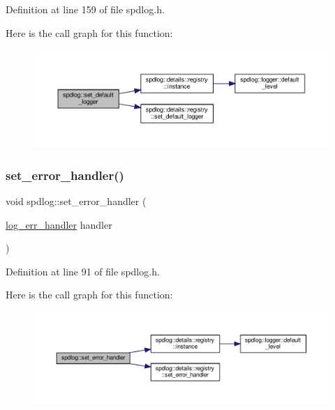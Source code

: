 Definition at line 159 of file spdlog.\+h.

Here is the call graph for this function\+:
\nopagebreak
\begin{figure}[H]
\begin{center}
\leavevmode
\includegraphics[width=350pt]{namespacespdlog_ab8a13bd805e706298e1e396ee5ac93bb_cgraph}
\end{center}
\end{figure}
\mbox{\label{namespacespdlog_aff4886a7bf8585815d8fd1f819f91be0}} 
\subsubsection{\texorpdfstring{set\+\_\+error\+\_\+handler()}{set\_error\_handler()}}
{\footnotesize\ttfamily void spdlog\+::set\+\_\+error\+\_\+handler (\begin{DoxyParamCaption}\item[{\hyperlink{namespacespdlog_ad3ed787a29f245c833ef66faf48036e2}{log\+\_\+err\+\_\+handler}}]{handler }\end{DoxyParamCaption})\hspace{0.3cm}{\ttfamily [inline]}}



Definition at line 91 of file spdlog.\+h.

Here is the call graph for this function\+:
\nopagebreak
\begin{figure}[H]
\begin{center}
\leavevmode
\includegraphics[width=350pt]{namespacespdlog_aff4886a7bf8585815d8fd1f819f91be0_cgraph}
\end{center}
\end{figure}
\mbox{\label{namespacespdlog_a83007016a4f374c8efcc738eee5b7290}} 
